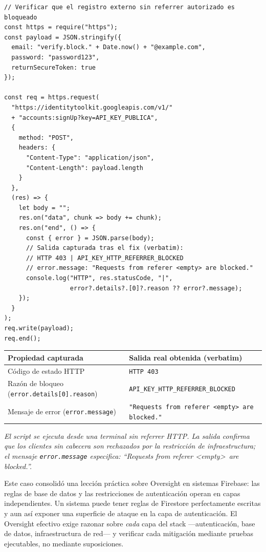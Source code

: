 \documentclass[14pt,a4paper,oneside]{extbook}
\begin{document}
\begin{tcolorbox}[
    colback=primary!5,
    colframe=primary!30,
    arc=5pt,
    title={Prueba ejecutable de superficie de autenticación (Node.js, listado referencial)}
]
\begin{verbatim}
// Verificar que el registro externo sin referrer autorizado es bloqueado
const https = require("https");
const payload = JSON.stringify({
  email: "verify.block." + Date.now() + "@example.com",
  password: "password123",
  returnSecureToken: true
});

const req = https.request(
  "https://identitytoolkit.googleapis.com/v1/"
  + "accounts:signUp?key=API_KEY_PUBLICA",
  {
    method: "POST",
    headers: {
      "Content-Type": "application/json",
      "Content-Length": payload.length
    }
  },
  (res) => {
    let body = "";
    res.on("data", chunk => body += chunk);
    res.on("end", () => {
      const { error } = JSON.parse(body);
      // Salida capturada tras el fix (verbatim):
      // HTTP 403 | API_KEY_HTTP_REFERRER_BLOCKED
      // error.message: "Requests from referer <empty> are blocked."
      console.log("HTTP", res.statusCode, "|",
                  error?.details?.[0]?.reason ?? error?.message);
    });
  }
);
req.write(payload);
req.end();
\end{verbatim}
\smallskip
\begin{center}
\small
\begin{tabular}{ll}
\toprule
\textbf{Propiedad capturada} & \textbf{Salida real obtenida (verbatim)} \\
\midrule
Código de estado HTTP & \texttt{HTTP 403} \\
Razón de bloqueo (\texttt{error.details[0].reason}) & \texttt{API\_KEY\_HTTP\_REFERRER\_BLOCKED} \\
Mensaje de error (\texttt{error.message}) & \verb|"Requests from referer <empty> are blocked."| \\
\bottomrule
\end{tabular}
\end{center}
\smallskip
\textit{El script se ejecuta desde una terminal sin referrer HTTP. La salida confirma que los clientes sin cabecera son rechazados por la restricción de infraestructura; el mensaje \texttt{error.message} especifica: \enquote{Requests from referer \textless empty\textgreater\ are blocked.}.}
\end{tcolorbox}

\begin{authorobservation}
Este caso consolidó una lección práctica sobre Oversight en sistemas Firebase: las reglas de base de datos y las restricciones de autenticación operan en capas independientes. Un sistema puede tener reglas de Firestore perfectamente escritas y aun así exponer una superficie de ataque en la capa de autenticación. El Oversight efectivo exige razonar sobre \textit{cada} capa del stack ---autenticación, base de datos, infraestructura de red--- y verificar cada mitigación mediante pruebas ejecutables, no mediante suposiciones.
\end{authorobservation}
\end{document}
